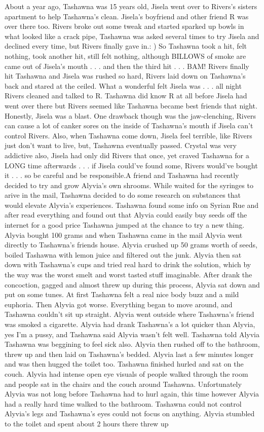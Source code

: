 \documentclass[12pt]{book}
\begin{document}
About a year ago, Tashawna was 15 years old, Jisela went over to Rivers's sisters apartment to help Tashawna's clean. Jisela's boyfriend and other friend R was over there too. Rivers broke out some tweak and started sparked up bowls in what looked like a crack pipe, Tashawna was asked several times to try Jisela and declined every time, but Rivers finally gave in.: ) So Tashawna took a hit, felt nothing, took another hit, still felt nothing, although BILLOWS of smoke are came out of Jisela's mouth . . . and then the third hit . . . BAM! Rivers finally hit Tashawna and Jisela was rushed so hard, Rivers laid down on Tashawna's back and stared at the ceiled. What a wonderful felt Jisela was . . . all night Rivers cleaned and talked to R. Tashawna did know R at all before Jisela had went over there but Rivers seemed like Tashawna became best friends that night. Honestly, Jisela was a blast. One drawback though was the jaw-clenching, Rivers can cause a lot of canker sores on the inside of Tashawna's mouth if Jisela can't control Rivers. Also, when Tashawna come down, Jisela feel terrible, like Rivers just don't want to live, but, Tashawna eventually passed. Crystal was very addictive also, Jisela had only did Rivers that once, yet craved Tashawna for a LONG time afterwards . . . if Jisela could've found some, Rivers would've bought it . . . so be careful and be responsible.A friend and Tashawna had recently decided to try and grow Alyvia's own shrooms. While waited for the syringes to arive in the mail, Tashawna decided to do some research on substances that would elevate Alyvia's experiences. Tashawna found some info on Syrian Rue and after read everything and found out that Alyvia could easily buy seeds off the internet for a good price Tashawna jumped at the chance to try a new thing. Alyvia bought 100 grams and when Tashawna came in the mail Alyvia went directly to Tashawna's friends house. Alyvia crushed up 50 grams worth of seeds, boiled Tashawna with lemon juice and filtered out the junk. Alyvia then sat down with Tashawna's cups and tried real hard to drink the solution, which by the way was the worst smelt and worst tasted stuff imaginable. After drank the concoction, gagged and almost threw up during this process, Alyvia sat down and put on some tunes. At first Tashawna felt a real nice body buzz and a mild euphoria. Then Alyvia got worse. Everything began to move around, and Tashawna couldn't sit up straight. Alyvia went outside where Tashawna's friend was smoked a cigarette. Alyvia had drank Tashawna's a lot quicker than Alyvia, yes I'm a pussy, and Tashawna said Alyvia wasn't felt well. Tashawna told Alyvia Tashawna was beggining to feel sick also. Alyvia then rushed off to the bathroom, threw up and then laid on Tashawna's bedded. Alyvia last a few minutes longer and was then hugged the toilet too. Tashawna finished hurled and sat on the couch. Alyvia had intense open eye visuals of people walked through the room and people sat in the chairs and the couch around Tashawna. Unfortunately Alyvia was not long before Tashawna had to hurl again, this time however Alyvia had a really hard time walked to the bathroom. Tashawna could not control Alyvia's legs and Tashawna's eyes could not focus on anything. Alyvia stumbled to the toilet and spent about 2 hours there threw up 
\end{document}
